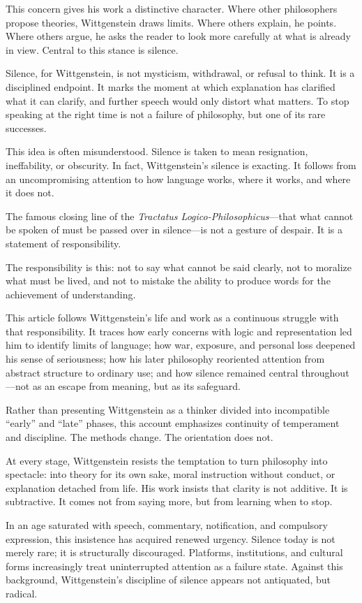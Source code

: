 \documentclass[11pt]{article}
\begin{document}
This concern gives his work a distinctive character. Where other philosophers propose theories, Wittgenstein draws limits. Where others explain, he points. Where others argue, he asks the reader to look more carefully at what is already in view. Central to this stance is silence.

Silence, for Wittgenstein, is not mysticism, withdrawal, or refusal to think. It is a disciplined endpoint. It marks the moment at which explanation has clarified what it can clarify, and further speech would only distort what matters. To stop speaking at the right time is not a failure of philosophy, but one of its rare successes.

This idea is often misunderstood. Silence is taken to mean resignation, ineffability, or obscurity. In fact, Wittgenstein’s silence is exacting. It follows from an uncompromising attention to how language works, where it works, and where it does not.

The famous closing line of the \emph{Tractatus Logico-Philosophicus}—that what cannot be spoken of must be passed over in silence—is not a gesture of despair. It is a statement of responsibility.

The responsibility is this: not to say what cannot be said clearly, not to moralize what must be lived, and not to mistake the ability to produce words for the achievement of understanding.

This article follows Wittgenstein’s life and work as a continuous struggle with that responsibility. It traces how early concerns with logic and representation led him to identify limits of language; how war, exposure, and personal loss deepened his sense of seriousness; how his later philosophy reoriented attention from abstract structure to ordinary use; and how silence remained central throughout—not as an escape from meaning, but as its safeguard.

Rather than presenting Wittgenstein as a thinker divided into incompatible “early” and “late” phases, this account emphasizes continuity of temperament and discipline. The methods change. The orientation does not.

At every stage, Wittgenstein resists the temptation to turn philosophy into spectacle: into theory for its own sake, moral instruction without conduct, or explanation detached from life. His work insists that clarity is not additive. It is subtractive. It comes not from saying more, but from learning when to stop.

In an age saturated with speech, commentary, notification, and compulsory expression, this insistence has acquired renewed urgency. Silence today is not merely rare; it is structurally discouraged. Platforms, institutions, and cultural forms increasingly treat uninterrupted attention as a failure state. Against this background, Wittgenstein’s discipline of silence appears not antiquated, but radical.
\end{document}
